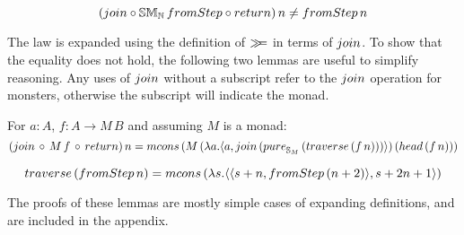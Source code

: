 $$
(\join \comp \stmon{\nat}\, \fromstepstr \comp \return)\, n 
\neq \fromstepstr\, n
$$

The law is expanded using the definition of $\mathbin{\gg\!\!=}$ in terms of $\join$. 
To show that the equality does not hold, the following two lemmas are useful to simplify reasoning. Any uses of $\join$ without a subscript refer to the $\join$ operation for monsters, otherwise the subscript will indicate the monad.

\begin{lemma}\label{lemma:general_bind_law}
For $a : A$, $f : A \rightarrow M\, B$ and assuming $M$ is a monad:
$$
(\join\, \comp\,  M\, f\, \comp\, \return)\, n = \mcons\, (M\,(\lambda a . \pair{a}{\join\, (\apure_{\stream{M}}\, (\traverse\, (f\, n)))})\, (\head\, (f\, n)))
$$
\end{lemma}
\begin{lemma}\label{lemma:traverse_fromstepstr}
$$
\traverse\, (\fromstepstr\, n) = \mcons\, (\lambda s . \pair{\pair{s+n}{\fromstepstr\, (n + 2)}}{s + 2n + 1})
$$
\end{lemma} 

The proofs of these lemmas are mostly simple cases of expanding definitions, and are included in the appendix.

